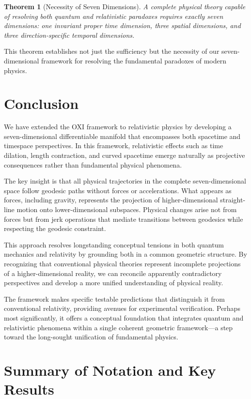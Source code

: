 \documentclass{article}
\newtheorem{theorem}{Theorem}
\begin{document}
\begin{theorem}[Necessity of Seven Dimensions]
A complete physical theory capable of resolving both quantum and relativistic paradoxes requires exactly seven dimensions: one invariant proper time dimension, three spatial dimensions, and three direction-specific temporal dimensions.
\end{theorem}

This theorem establishes not just the sufficiency but the necessity of our seven-dimensional framework for resolving the fundamental paradoxes of modern physics.

\section{Conclusion}

We have extended the OXI framework to relativistic physics by developing a seven-dimensional differentiable manifold that encompasses both spacetime and timespace perspectives. In this framework, relativistic effects such as time dilation, length contraction, and curved spacetime emerge naturally as projective consequences rather than fundamental physical phenomena.

The key insight is that all physical trajectories in the complete seven-dimensional space follow geodesic paths without forces or accelerations. What appears as forces, including gravity, represents the projection of higher-dimensional straight-line motion onto lower-dimensional subspaces. Physical changes arise not from forces but from jerk operations that mediate transitions between geodesics while respecting the geodesic constraint.

This approach resolves longstanding conceptual tensions in both quantum mechanics and relativity by grounding both in a common geometric structure. By recognizing that conventional physical theories represent incomplete projections of a higher-dimensional reality, we can reconcile apparently contradictory perspectives and develop a more unified understanding of physical reality.

The framework makes specific testable predictions that distinguish it from conventional relativity, providing avenues for experimental verification. Perhaps most significantly, it offers a conceptual foundation that integrates quantum and relativistic phenomena within a single coherent geometric framework—a step toward the long-sought unification of fundamental physics.

\section{Summary of Notation and Key Results}
\end{document}
